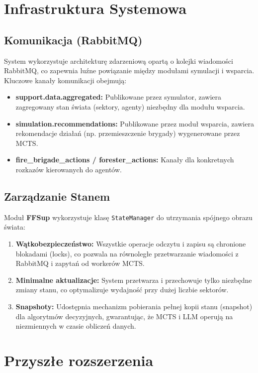 \section{Infrastruktura Systemowa}

\subsection{Komunikacja (RabbitMQ)}
System wykorzystuje architekturę zdarzeniową opartą o kolejki wiadomości RabbitMQ, co zapewnia luźne powiązanie między modułami symulacji i wsparcia. Kluczowe kanały komunikacji obejmują:

\begin{itemize}
    \item \textbf{support.data.aggregated:} Publikowane przez symulator, zawiera zagregowany stan świata (sektory, agenty) niezbędny dla modułu wsparcia.
    \item \textbf{simulation.recommendations:} Publikowane przez moduł wsparcia, zawiera rekomendacje działań (np. przemieszczenie brygady) wygenerowane przez MCTS.
    \item \textbf{fire\_brigade\_actions / forester\_actions:} Kanały dla konkretnych rozkazów kierowanych do agentów.
\end{itemize}

\subsection{Zarządzanie Stanem}
Moduł \textbf{FFSup} wykorzystuje klasę \texttt{StateManager} do utrzymania spójnego obrazu świata:
\begin{enumerate}
    \item \textbf{Wątkobezpieczeństwo:} Wszystkie operacje odczytu i zapisu są chronione blokadami (locks), co pozwala na równoległe przetwarzanie wiadomości z RabbitMQ i zapytań od workerów MCTS.
    \item \textbf{Minimalne aktualizacje:} System przetwarza i przechowuje tylko niezbędne zmiany stanu, co optymalizuje wydajność przy dużej liczbie sektorów.
    \item \textbf{Snapshoty:} Udostępnia mechanizm pobierania pełnej kopii stanu (snapshot) dla algorytmów decyzyjnych, gwarantując, że MCTS i LLM operują na niezmiennych w czasie obliczeń danych.
\end{enumerate}

\section{Przyszłe rozszerzenia}

